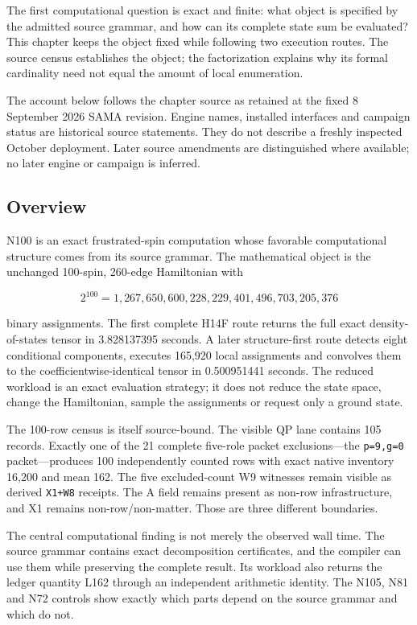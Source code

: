 \label{viii-ch01-n100-grammar-and-exact-work}

The first computational question is exact and finite: what object is
specified by the admitted source grammar, and how can its complete state
sum be evaluated? This chapter keeps the object fixed while following
two execution routes. The source census establishes the object; the
factorization explains why its formal cardinality need not equal the
amount of local enumeration.

The account below follows the chapter source as retained at the fixed 8
September 2026 SAMA revision. Engine names, installed interfaces and
campaign status are historical source statements. They do not describe a
freshly inspected October deployment. Later source amendments are
distinguished where available; no later engine or campaign is inferred.

\subsection{Overview}\label{viii-ch01-overview}

N100 is an exact frustrated-spin computation whose favorable
computational structure comes from its source grammar. The mathematical
object is the unchanged 100-spin, 260-edge Hamiltonian with

\[
2^{100}=1{,}267{,}650{,}600{,}228{,}229{,}401{,}496{,}703{,}205{,}376
\]

binary assignments. The first complete H14F route returns the full exact
density-of-states tensor in 3.828137395 seconds. A later structure-first
route detects eight conditional components, executes 165,920 local
assignments and convolves them to the coefficientwise-identical tensor
in 0.500951441 seconds. The reduced workload is an exact evaluation
strategy; it does not reduce the state space, change the Hamiltonian,
sample the assignments or request only a ground state.

The 100-row census is itself source-bound. The visible QP lane contains
105 records. Exactly one of the 21 complete five-role packet
exclusions---the \texttt{p=9,g=0} packet---produces 100 independently
counted rows with exact native inventory 16,200 and mean 162. The five
excluded-count W9 witnesses remain visible as derived \texttt{X1+W8}
receipts. The A field remains present as non-row infrastructure, and X1
remains non-row/non-matter. Those are three different boundaries.

The central computational finding is not merely the observed wall time.
The source grammar contains exact decomposition certificates, and the
compiler can use them while preserving the complete result. Its workload
also returns the ledger quantity L162 through an independent arithmetic
identity. The N105, N81 and N72 controls show exactly which parts depend
on the source grammar and which do not.

